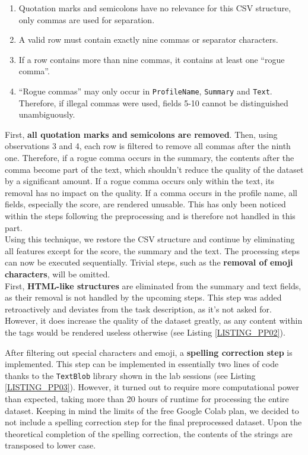 \begin{enumerate}
    \item Quotation marks and semicolons have no relevance for this CSV structure, only commas are used for separation.
    \item  A valid row must contain exactly nine commas or separator characters.
    \item If a row contains more than nine commas, it contains at least one “rogue comma”.
    \item “Rogue commas” may only occur in \texttt{ProfileName}, \texttt{Summary} and \texttt{Text}. Therefore, if illegal commas were used, fields 5-10 cannot be distinguished unambiguously.
\end{enumerate}

\newpage

\noindent
First, \textbf{all quotation marks and semicolons are removed}. Then, using observations 3 and 4, each row is filtered to remove all commas after the ninth one. Therefore, if a rogue comma occurs in the summary, the contents after the comma become part of the text, which shouldn’t reduce the quality of the dataset by a significant amount. If a rogue comma occurs only within the text, its removal has no impact on the quality.  If a comma occurs in the profile name, all fields, especially the score, are rendered unusable. This has only been noticed within the steps following the preprocessing and is therefore not handled in this part.\\

Using this technique, we restore the CSV structure and continue by eliminating all features except for the score, the summary and the text. The processing steps can now be executed sequentially. Trivial steps, such as the \textbf{removal of emoji characters}, will be omitted.\\

First, \textbf{HTML-like structures} are eliminated from the summary and text fields, as their removal is not handled by the upcoming steps. This step was added retroactively and deviates from the task description, as it’s not asked for. However, it does increase the quality of the dataset greatly, as any content within the tags would be rendered useless otherwise (see Listing \ref{LISTING_PP02}).


After filtering out special characters and emoji, a \textbf{spelling correction step} is implemented. This step can be implemented in essentially two lines of code thanks to the \texttt{TextBlob} library shown in the lab sessions (see Listing \ref{LISTING_PP03}). However, it turned out to require more computational power than expected, taking more than 20 hours of runtime for processing the entire dataset. Keeping in mind the limits of the free Google Colab plan, we decided to not include a spelling correction step for the final preprocessed dataset. Upon the theoretical completion of the spelling correction, the contents of the strings are transposed to lower case. 

